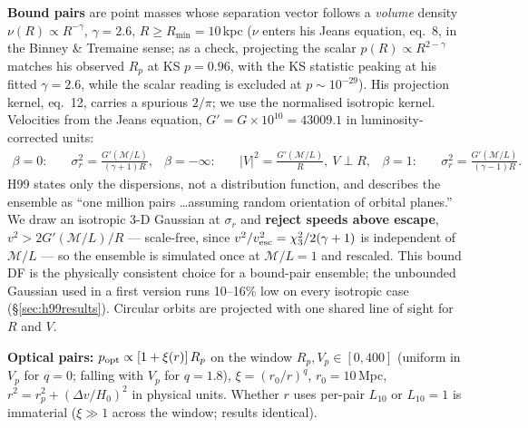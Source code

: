 \documentclass[11pt]{article}
\newcommand{\ML}{\ensuremath{\mathcal{M}/L}}
\begin{document}
\textbf{Bound pairs} are point masses whose separation vector follows a
\emph{volume} density $\nu(R) \propto R^{-\gamma}$, $\gamma = 2.6$,
$R \ge R_{\min} = 10$\,kpc ($\nu$ enters his Jeans equation, eq.~8, in the
Binney \& Tremaine sense; as a check, projecting the scalar
$p(R) \propto R^{2-\gamma}$ matches his observed $R_p$ at KS $p = 0.96$, with
the KS statistic peaking at his fitted $\gamma = 2.6$, while the scalar
reading is excluded at $p \sim 10^{-29}$). His projection kernel, eq.~12,
carries a spurious $2/\pi$; we use the normalised isotropic kernel. Velocities
from the Jeans equation, $G' = G\times10^{10} = 43009.1$ in luminosity-corrected
units:
\begin{align}
\beta = 0:\quad & \sigma_r^2 = \frac{G'(\ML)}{(\gamma+1)R}, &
\beta = -\infty:\quad & |V|^2 = \frac{G'(\ML)}{R},\ V\perp R, &
\beta = 1:\quad & \sigma_r^2 = \frac{G'(\ML)}{(\gamma-1)R}.
\end{align}
H99 states only the dispersions, not a distribution function, and describes
the ensemble as ``one million pairs \ldots assuming random orientation of
orbital planes.'' We draw an isotropic 3-D Gaussian at $\sigma_r$ and
\textbf{reject speeds above escape}, $v^2 > 2G'(\ML)/R$ --- scale-free, since
$v^2/v_{\rm esc}^2 = \chi^2_3/2(\gamma+1)$ is independent of \ML{} --- so the
ensemble is simulated once at $\ML = 1$ and rescaled. This bound DF is the
physically consistent choice for a bound-pair ensemble; the unbounded
Gaussian used in a first version runs 10--16\% low on every isotropic case
(\S\ref{sec:h99results}). Circular orbits are projected with one shared line
of sight for $R$ and $V$.

\textbf{Optical pairs:} $p_{\rm opt} \propto [1+\xi(r)]\,R_p$ on the window
$R_p, V_p \in [0,400]$ (uniform in $V_p$ for $q=0$; falling with $V_p$ for
$q=1.8$), $\xi = (r_0/r)^q$, $r_0 = 10$\,Mpc,
$r^2 = r_p^2 + (\Delta v/H_0)^2$ in physical units. Whether $r$ uses per-pair
$L_{10}$ or $L_{10}=1$ is immaterial ($\xi \gg 1$ across the window; results
identical).
\end{document}
